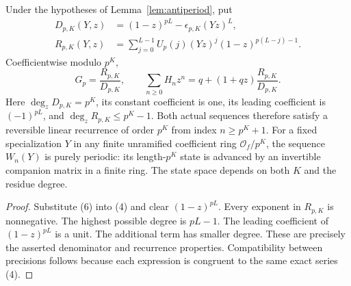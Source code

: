 \documentclass[11pt]{article}
\begin{document}
\begin{proposition}
\label{prop:rational}
Under the hypotheses of Lemma~\ref{lem:antiperiod}, put
\[
 \begin{split}
 D_{p,K}(Y,z)&=(1-z)^{pL}-\epsilon_{p,K}(Yz)^L,\\
 R_{p,K}(Y,z)&=
 \sum_{j=0}^{L-1}U_p(j)(Yz)^j(1-z)^{p(L-j)-1}.
 \end{split}
\]
Coefficientwise modulo $p^K$,
\[
 G_p=\frac{R_{p,K}}{D_{p,K}},\qquad
 \sum_{n\ge0}H_nz^n=q+(1+qz)\frac{R_{p,K}}{D_{p,K}}.
 \tag{7}
\]
Here $\deg_zD_{p,K}=p^K$, its constant coefficient is one,
its leading coefficient is $(-1)^{pL}$, and
$\deg_zR_{p,K}\le p^K-1$.
Both actual sequences therefore satisfy a reversible linear
recurrence of order $p^K$ from index $n\ge p^K+1$.
For a fixed specialization $Y$ in any finite unramified
coefficient ring $\mathcal O_f/p^K$, the sequence $W_n(Y)$
is purely periodic: its length-$p^K$ state is advanced by an
invertible companion matrix in a finite ring.
The state space depends on both $K$ and the residue degree.
\end{proposition}
\begin{proof}
Substitute (6) into (4) and clear $(1-z)^{pL}$.
Every exponent in $R_{p,K}$ is nonnegative.
The highest possible degree is $pL-1$.
The leading coefficient of $(1-z)^{pL}$ is a unit. The additional term has smaller degree.
These are precisely the asserted denominator and recurrence
properties. Compatibility between precisions follows because
each expression is congruent to the same exact series (4).
\end{proof}
\end{document}
